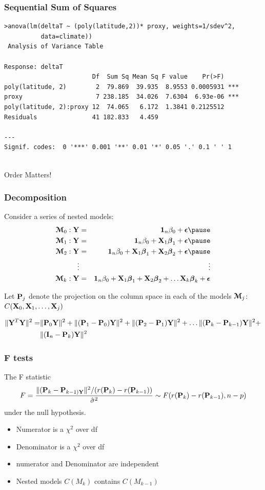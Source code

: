 \documentclass[handout]{beamer}
\begin{document}
\begin{frame}[fragile]
 \frametitle{Sequential Sum of Squares}
   \begin{small}
\begin{verbatim}
>anova(lm(deltaT ~ (poly(latitude,2))* proxy, weights=1/sdev^2,
          data=climate))
 Analysis of Variance Table

Response: deltaT
                        Df  Sum Sq Mean Sq F value    Pr(>F)    
poly(latitude, 2)        2  79.869  39.935  8.9553 0.0005931 ***
proxy                    7 238.185  34.026  7.6304  6.93e-06 ***
poly(latitude, 2):proxy 12  74.065   6.172  1.3841 0.2125512    
Residuals               41 182.833   4.459                      
                   
---
Signif. codes:  0 '***' 0.001 '**' 0.01 '*' 0.05 '.' 0.1 ' ' 1 
 
\end{verbatim}
\end{small}
Order Matters!
\end{frame}
\begin{frame}
  \frametitle{Decomposition}
  Consider a series of nested models: \pause
  \begin{eqnarray*}
    \M_0: \Y & = & \one_n \beta_0 + \eps   \pause\\
\M_1: \Y & = & \one_n \beta_0 + \X_1 \b_1 + \eps  \pause \\
\M_2: \Y & = & \one_n \beta_0 + \X_1 \b_1 + \X_2 \b_2 + \eps   \pause\\
\vdots & & \vdots \\
\M_k: \Y & = & \one_n \beta_0 + \X_1 \b_1 + \X_2 \b_2 + \ldots \X_k \b_k + \eps 
  \end{eqnarray*} \pause

Let $\P_j$ denote the projection on the column space in each of the
models $\M_j$: $C(\X_0, \X_1, \ldots, \X_j)$ \pause
\begin{small}
  \begin{align*}
\| \Y^T\Y \|^2 =&  \| \P_0 \Y\|^2 + \| (\P_1 - \P_0) \Y \|^2 + \|(\P_2
- \P_1)\Y\|^2 + \ldots \| (\P_k - \P_{k-1})\Y \|^2 + \\ 
& \|(\I_n -
\P_k)\Y\|^2
 \end{align*}
\end{small}

\end{frame}
\begin{frame}
  \frametitle{F tests}
The F statistic
$$F =  \frac{\| (\P_k - \P_{k-1 )\Y} \|^2 /(r(\P_{k}) - r(\P_{k-1})) }
{\hat{\sigma}^2} \sim F( r(\P_{k}) - r(\P_{k-1}),  n - p)$$
under the null hypothesis.\pause
\begin{itemize}
\item Numerator is a $\chi^2$ over df \pause
\item Denominator is a $\chi^2$ over df \pause
\item numerator and Denominator are independent \pause

\item Nested models $C(M_k)$ contains $C(M_{k-1})$ \pause
\end{itemize}
\end{frame}
\end{document}
